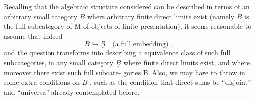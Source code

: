 Recalling that the algebraic structure considered can be described
in terms of an arbitrary small category $\underline{B}$ where arbitrary finite direct
limits exist  (namely $\underline{B}$ is the full subcategory of M of objects of
finite presentation),  it seems reasonable to assume that indeed
\[ B \hookrightarrow \underline{B} \quad \text{(a full embedding)} \ , \]
and the question transforms into describing a  equivalence class 
of such full subcategories,  in  any small category $\underline{B}$  where finite
direct limits exist,  and where moreover there exist such full subcate-%
gories B.  Also,  we may  have to throw in some extra conditions on
$\underline{B}$ ,  such as the condition that direct sums be ``disjoint'' and ``universa'' \hand{\unsure{$(^{*})$}}
already contemplated before.
